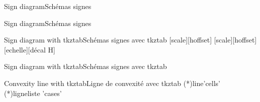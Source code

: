 \documentclass[a4paper,english,11pt]{article}
\begin{document}
\begin{myprestexcode}{Sign diagram}{Schémas signes}

\end{myprestexcode}

\begin{myprestex}{Sign diagram}{Schémas signes}
\pflminisignplot*[code=pa+d+,roots={1/2},color=orange]
\end{myprestex}

\begin{myprestexcode}{Sign diagram with tkztab}{Schémas signes avec tkztab}
[scale][hoffset]
[scale][hoffset]
[echelle][décal H]

\end{myprestexcode}

\begin{myprestex}{Sign diagram with tkztab}{Schémas signes avec tkztab}
\end{myprestex}

\begin{myprestexcode}{Convexity line with tkztab}{Ligne de convexité avec tkztab}
\pfltkztabcvx(*){line}{'cells'}
\tkzTabLineConvex(*){ligne}{liste 'cases'}

\end{myprestexcode}
\end{document}
